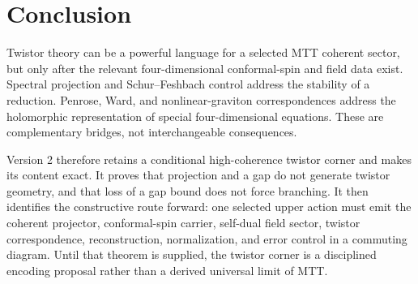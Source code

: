 \documentclass[11pt]{article}
\begin{document}
\section{Conclusion}

Twistor theory can be a powerful language for a selected MTT coherent sector,
but only after the relevant four-dimensional conformal-spin and field data
exist. Spectral projection and Schur--Feshbach control address the stability
of a reduction. Penrose, Ward, and nonlinear-graviton correspondences address
the holomorphic representation of special four-dimensional equations. These
are complementary bridges, not interchangeable consequences.

Version 2 therefore retains a conditional high-coherence twistor corner and
makes its content exact. It proves that projection and a gap do not generate
twistor geometry, and that loss of a gap bound does not force branching. It
then identifies the constructive route forward: one selected upper action
must emit the coherent projector, conformal-spin carrier, self-dual field
sector, twistor correspondence, reconstruction, normalization, and error
control in a commuting diagram. Until that theorem is supplied, the twistor
corner is a disciplined encoding proposal rather than a derived universal
limit of MTT.
\end{document}
